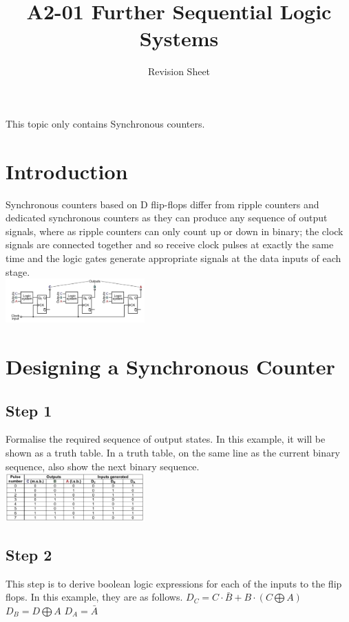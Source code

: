 \documentclass[a4paper, 11pt, twocolumn]{article}
\title{A2-01 Further Sequential Logic Systems}
\author{Revision Sheet}
\date{}
\begin{document}
\maketitle
\thispagestyle{fancy}
\noindent This topic only contains Synchronous counters.
\section{Introduction}
Synchronous counters based on D flip-flops differ from ripple counters and dedicated synchronous counters as they can produce any sequence of output signals, where as ripple counters can only count up or down in binary; the clock signals are connected together and so receive clock pulses at exactly the same time and the logic gates generate appropriate signals at the data inputs of each stage.\\
\includegraphics[width=0.4\textwidth]{basicDiagram.jpg}\\

\section{Designing a Synchronous Counter}
\subsection{Step 1}
Formalise the required sequence of output states. In this example, it will be shown as a truth table. In a truth table, on the same line as the current binary sequence, also show the next binary sequence. \\
\includegraphics[width=0.4\textwidth]{step1.jpg}\\

\subsection{Step 2}
This step is to derive boolean logic expressions for each of the inputs to the flip flops. In this example, they are as follows.\newline
$D_{C}=C \cdot \bar{B} + B \cdot (C \bigoplus A)$\newline
$D_B = D \bigoplus A$\newline
$D_A = \bar{A}$
\end{document}
